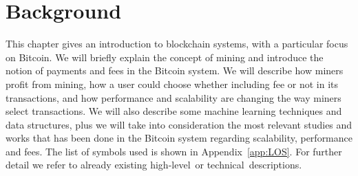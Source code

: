 \documentclass[USenglish]{uit-thesis}
\begin{document}
\chapter{Background}
\label{chap:techback}
This chapter gives an introduction to
blockchain systems, with a particular
focus on Bitcoin. We will briefly explain
the concept of mining and introduce the notion
of payments and fees in the Bitcoin system.
We will describe
how miners profit from mining,
how a user could choose whether including fee or not in its
transactions, and how performance and scalability are
changing the way miners select transactions.
We will also describe some machine learning
techniques and data structures, plus we will take into
consideration the most relevant studies and works
that has been done in the Bitcoin system regarding
scalability, performance and fees.
The list of symbols
used is shown in Appendix~\ref{app:LOS}.
For further detail we refer
to already existing high-level\,\cite{Bohme2015BETG} or
technical\,\cite{ethereum, bitcoinmining,
	bitcoin_blockchain, Rizun:2015:blocksizelimit, Nakamoto_bitcoin,
	ethereum_white_paper} descriptions.
\end{document}
